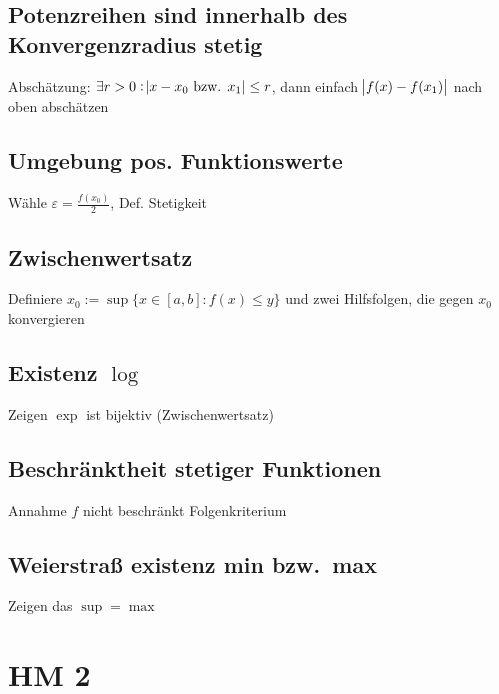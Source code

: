 \subsection{Potenzreihen sind innerhalb des Konvergenzradius stetig }
 Abschätzung: $\exists r>0 : \abs{x-x_0 \text{ bzw. }
 x_1} \leq r$, dann einfach $\abs{f(x)-f(x_1)}$ nach oben abschätzen
\subsection{Umgebung pos. Funktionswerte }
 Wähle $\varepsilon = \frac{f(x_0)}{2}$, Def. Stetigkeit
\subsection{Zwischenwertsatz }
 Definiere $x_0 := \sup \{x \in [a,b] : f(x) \leq y \}$ und zwei Hilfsfolgen, die gegen $x_0$ konvergieren
\subsection{Existenz $\log$ }
 Zeigen $\exp$ ist bijektiv (Zwischenwertsatz)
\subsection{Beschränktheit stetiger Funktionen}
 Annahme $f$ nicht beschränkt Folgenkriterium
\subsection{Weierstraß existenz min bzw.\ max }
 Zeigen das $\sup=\max$

 \section{HM 2}
